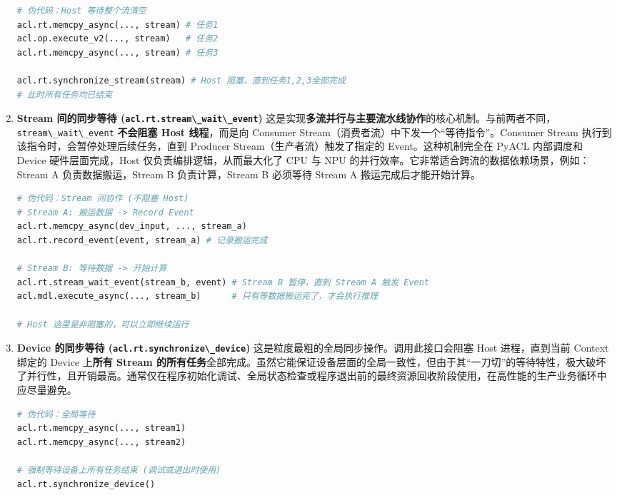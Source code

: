\begin{enumerate}
\begin{lstlisting}[language=Python]
# 伪代码：Host 等待整个流清空
acl.rt.memcpy_async(..., stream) # 任务1
acl.op.execute_v2(..., stream)   # 任务2
acl.rt.memcpy_async(..., stream) # 任务3

acl.rt.synchronize_stream(stream) # Host 阻塞，直到任务1,2,3全部完成
# 此时所有任务均已结束
\end{lstlisting}
\item
  \textbf{Stream 间的同步等待
  (\passthrough{\lstinline!acl.rt.stream\_wait\_event!})}
  这是实现\textbf{多流并行与主要流水线协作}的核心机制。与前两者不同，\passthrough{\lstinline!stream\_wait\_event!}
  \textbf{不会阻塞 Host 线程}，而是向 Consumer
  Stream（消费者流）中下发一个``等待指令''。Consumer Stream
  执行到该指令时，会暂停处理后续任务，直到 Producer
  Stream（生产者流）触发了指定的 Event。这种机制完全在 PyACL 内部调度和
  Device 硬件层面完成，Host 仅负责编排逻辑，从而最大化了 CPU 与 NPU
  的并行效率。它非常适合跨流的数据依赖场景，例如：Stream A
  负责数据搬运，Stream B 负责计算，Stream B 必须等待 Stream A
  搬运完成后才能开始计算。

\begin{lstlisting}[language=Python]
# 伪代码：Stream 间协作 (不阻塞 Host)
# Stream A: 搬运数据 -> Record Event
acl.rt.memcpy_async(dev_input, ..., stream_a)
acl.rt.record_event(event, stream_a) # 记录搬运完成

# Stream B: 等待数据 -> 开始计算
acl.rt.stream_wait_event(stream_b, event) # Stream B 暂停，直到 Stream A 触发 Event
acl.mdl.execute_async(..., stream_b)      # 只有等数据搬运完了，才会执行推理

# Host 这里是非阻塞的，可以立即继续运行
\end{lstlisting}
\item
  \textbf{Device 的同步等待
  (\passthrough{\lstinline!acl.rt.synchronize\_device!})}
  这是粒度最粗的全局同步操作。调用此接口会阻塞 Host 进程，直到当前
  Context 绑定的 Device 上\textbf{所有 Stream
  的所有任务}全部完成。虽然它能保证设备层面的全局一致性，但由于其``一刀切''的等待特性，极大破坏了并行性，且开销最高。通常仅在程序初始化调试、全局状态检查或程序退出前的最终资源回收阶段使用，在高性能的生产业务循环中应尽量避免。

\begin{lstlisting}[language=Python]
# 伪代码：全局等待
acl.rt.memcpy_async(..., stream1)
acl.rt.memcpy_async(..., stream2)

# 强制等待设备上所有任务结束 (调试或退出时使用)
acl.rt.synchronize_device()
\end{lstlisting}
\end{enumerate}

